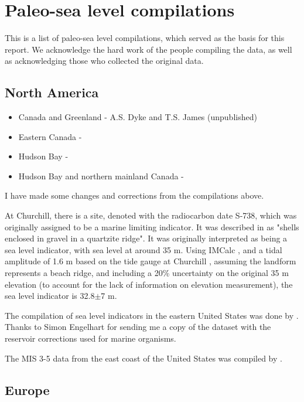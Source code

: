 \section{Paleo-sea level compilations}

This is a list of paleo-sea level compilations, which served as the basis for this report. We acknowledge the hard work of the people compiling the data, as well as acknowledging those who collected the original data.

\subsection{North America}

\begin{itemize}
  \item Canada and Greenland - A.S. Dyke and T.S. James (unpublished)
  \item Eastern Canada - \citet{VacchiEtal2018}
  \item Hudson Bay - \citet{SimonEtal2016}
  \item Hudson Bay and northern mainland Canada - \citet{GowanEtal2016}
\end{itemize}

I have made some changes and corrections from the compilations above.

At Churchill, there is a site, denoted with the radiocarbon date S-738, which was originally assigned to be a marine limiting indicator. It was described in \citet{MorlanEtal2000} as "shells enclosed in gravel in a quartzite ridge". It was originally interpreted as being a sea level indicator, with sea level at around 35 m. Using IMCalc  \citep{LorscheidRovere2019}, and a tidal amplitude of 1.6 m based on the tide gauge at Churchill \citep{Ray2016}, assuming the landform represents a beach ridge, and including a 20\% uncertainty on the original 35 m elevation (to account for the lack of information on elevation measurement), the sea level indicator is 32.8$\pm$7 m.

The compilation of sea level indicators in the eastern United States was done by \citet{EngelhartHorton2012}. Thanks to Simon Engelhart for sending me a copy of the dataset with the reservoir corrections used for marine organisms.

The MIS 3-5 data from the east coast of the United States was compiled by \citet{PicoEtal2017}.

\subsection{Europe}

